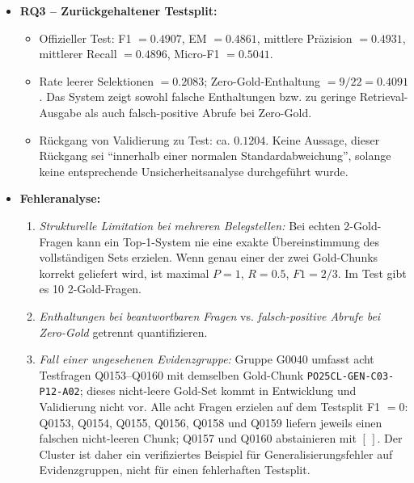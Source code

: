 \documentclass[11pt]{article}
\begin{document}
\begin{leitfragenbox}
\begin{itemize}
    \begin{itemize}
        \item E5 + Top-1 + Schwellenwert $0.83959$: F1 $=0.6111$, EM $=0.5972$, mittlere Präzision $=0.6181$, mittlerer Recall $=0.6076$, Zero-Gold-Enthaltungsrate $=0.4167$.
        \item Nur die f\"unf eingefrorenen Finalisten wurden auf dem Validierungssplit verglichen; Sentence-BERT war nicht unter diesen f\"unf Finalisten. Daher Validierung nicht als erneuten vollst\"andigen Drei-Repr\"asentationen-Vergleich formulieren.
    \end{itemize}
    \item \textbf{RQ3 -- Zurückgehaltener Testsplit:}
    \begin{itemize}
        \item Offizieller Test: F1 $=0.4907$, EM $=0.4861$, mittlere Präzision $=0.4931$, mittlerer Recall $=0.4896$, Micro-F1 $=0.5041$.
        \item Rate leerer Selektionen $=0.2083$; Zero-Gold-Enthaltung $=9/22=0.4091$. Das System zeigt sowohl falsche Enthaltungen bzw. zu geringe Retrieval-Ausgabe als auch falsch-positive Abrufe bei Zero-Gold.
        \item Rückgang von Validierung zu Test: ca. $0.1204$. Keine Aussage, dieser Rückgang sei ``innerhalb einer normalen Standardabweichung'', solange keine entsprechende Unsicherheitsanalyse durchgef\"uhrt wurde.
    \end{itemize}
    \item \textbf{Fehleranalyse:}
    \begin{enumerate}
        \item \textit{Strukturelle Limitation bei mehreren Belegstellen:} Bei echten 2-Gold-Fragen kann ein Top-1-System nie eine exakte Übereinstimmung des vollständigen Sets erzielen. Wenn genau einer der zwei Gold-Chunks korrekt geliefert wird, ist maximal $P=1$, $R=0.5$, $F1=2/3$. Im Test gibt es 10 2-Gold-Fragen.
        \item \textit{Enthaltungen bei beantwortbaren Fragen} vs. \textit{falsch-positive Abrufe bei Zero-Gold} getrennt quantifizieren.
        \item \textit{Fall einer ungesehenen Evidenzgruppe:} Gruppe G0040 umfasst acht Testfragen Q0153--Q0160 mit demselben Gold-Chunk \texttt{PO25CL-GEN-C03-P12-A02}; dieses nicht-leere Gold-Set kommt in Entwicklung und Validierung nicht vor. Alle acht Fragen erzielen auf dem Testsplit F1 $=0$: Q0153, Q0154, Q0155, Q0156, Q0158 und Q0159 liefern jeweils einen falschen nicht-leeren Chunk; Q0157 und Q0160 abstainieren mit $[\,]$. Der Cluster ist daher ein verifiziertes Beispiel f\"ur Generalisierungsfehler auf Evidenzgruppen, nicht f\"ur einen fehlerhaften Testsplit.

\end{enumerate}
\end{itemize}
\end{leitfragenbox}
\end{document}
